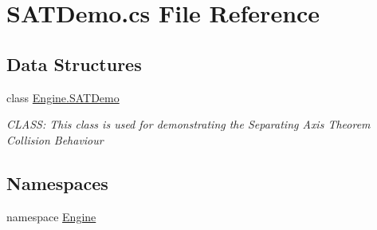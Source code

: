\hypertarget{a00206}{}\section{S\+A\+T\+Demo.\+cs File Reference}
\label{a00206}
\subsection*{Data Structures}
\begin{DoxyCompactItemize}
\item 
class \hyperlink{a00566}{Engine.\+S\+A\+T\+Demo}
\begin{DoxyCompactList}\small\item\em C\+L\+A\+SS\+: This class is used for demonstrating the Separating Axis Theorem Collision Behaviour \end{DoxyCompactList}\end{DoxyCompactItemize}
\subsection*{Namespaces}
\begin{DoxyCompactItemize}
\item 
namespace \hyperlink{a00240}{Engine}
\end{DoxyCompactItemize}
